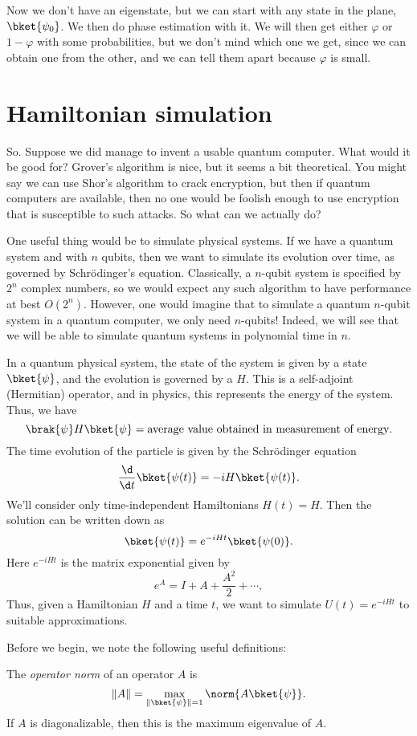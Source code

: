 \documentclass[a4paper]{article}
\begin{document}
Now we don't have an eigenstate, but we can start with any state in the plane, $\bket{\psi_0}$. We then do phase estimation with it. We will then get either $\varphi$ or $1 - \varphi$ with some probabilities, but we don't mind which one we get, since we can obtain one from the other, and we can tell them apart because $\varphi$ is small.

\section{Hamiltonian simulation}
So. Suppose we did manage to invent a usable quantum computer. What would it be good for? Grover's algorithm is nice, but it seems a bit theoretical. You might say we can use Shor's algorithm to crack encryption, but then if quantum computers are available, then no one would be foolish enough to use encryption that is susceptible to such attacks. So what can we actually do?

One useful thing would be to simulate physical systems. If we have a quantum system and with $n$ qubits, then we want to simulate its evolution over time, as governed by Schr\"odinger's equation. Classically, a $n$-qubit system is specified by $2^n$ complex numbers, so we would expect any such algorithm to have performance at best $O(2^n)$. However, one would imagine that to simulate a quantum $n$-qubit system in a quantum computer, we only need $n$-qubits! Indeed, we will see that we will be able to simulate quantum systems in polynomial time in $n$.

In a quantum physical system, the state of the system is given by a state $\bket{\psi}$, and the evolution is governed by a  $H$. This is a self-adjoint (Hermitian) operator, and in physics, this represents the energy of the system. Thus, we have
\[
  \brak{\psi} H \bket{\psi} = \text{average value obtained in measurement of energy}.
\]
The time evolution of the particle is given by the Schr\"odinger equation
\[
  \frac{\d}{\d t} \bket{\psi(t)} = -i H \bket{\psi(t)}.
\]
We'll consider only time-independent Hamiltonians $H(t) = H$. Then the solution can be written down as
\[
  \bket{\psi(t)} = e^{-iHt} \bket{\psi(0)}.
\]
Here $e^{-iHt}$ is the matrix exponential given by
\[
  e^A = I + A + \frac{A^2}{2} + \cdots,
\]
Thus, given a Hamiltonian $H$ and a time $t$, we want to simulate $U(t) = e^{-iHt}$ to suitable approximations.

Before we begin, we note the following useful definitions:
\begin{defi}
  The \emph{operator norm} of an operator $A$ is
  \[
    \|A\| = \max_{\|\bket{\psi}\| = 1} \norm{A \bket{\psi}}.
  \]
  If $A$ is diagonalizable, then this is the maximum eigenvalue of $A$.
\end{defi}
\end{document}
